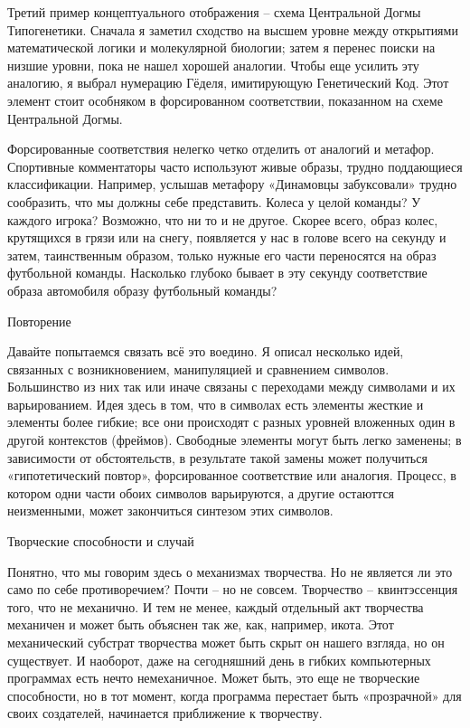 \documentclass[../main.tex]{subfiles}
\begin{document}
Третий пример концептуального отображения \--- схема Центральной Догмы Типогенетики. Сначала я заметил сходство на высшем уровне между открытиями математической логики и молекулярной биологии; затем я перенес поиски на низшие уровни, пока не нашел хорошей аналогии. Чтобы еще усилить эту аналогию, я выбрал нумерацию Гёделя, имитирующую Генетический Код. Этот элемент стоит особняком в форсированном соответствии, показанном на схеме Центральной Догмы.

Форсированные соответствия нелегко четко отделить от аналогий и метафор. Спортивные комментаторы часто используют живые образы, трудно поддающиеся классификации. Например, услышав метафору «Динамовцы забуксовали» трудно сообразить, что мы должны себе представить. Колеса у целой команды? У каждого игрока? Возможно, что ни то и не другое. Скорее всего, образ колес, крутящихся в грязи или на снегу, появляется у нас в голове всего на секунду и затем, таинственным образом, только нужные его части переносятся на образ футбольной команды. Насколько глубоко бывает в эту секунду соответствие образа автомобиля образу футбольный команды?

Повторение

Давайте попытаемся связать всё это воедино. Я описал несколько идей, связанных с возникновением, манипуляцией и сравнением символов. Большинство из них так или иначе связаны с переходами между символами и их варьированием. Идея здесь в том, что в символах есть элементы жесткие и элементы более гибкие; все они происходят с разных уровней вложенных один в другой контекстов (фреймов). Свободные элементы могут быть легко заменены; в зависимости от обстоятельств, в результате такой замены может получиться «гипотетический повтор», форсированное соответствие или аналогия. Процесс, в котором одни части обоих символов варьируются, а другие остаюттся неизменными, может закончиться синтезом этих символов.

Творческие способности и случай

Понятно, что мы говорим здесь о механизмах творчества. Но не является ли это само по себе противоречием? Почти \--- но не совсем. Творчество \--- квинтэссенция того, что не механично. И тем не менее, каждый отдельный акт творчества механичен и может быть объяснен так же, как, например, икота. Этот механический субстрат творчества может быть скрыт он нашего взгляда, но он существует. И наоборот, даже на сегодняшний день в гибких компьютерных программах есть нечто немеханичное. Может быть, это еще не творческие способности, но в тот момент, когда программа перестает быть «прозрачной» для своих создателей, начинается приближение к творчеству.
\end{document}
